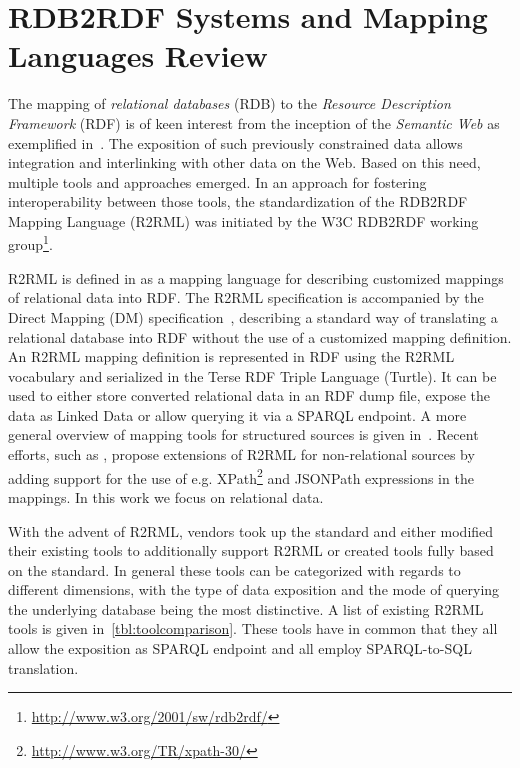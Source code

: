 \section{RDB2RDF Systems and Mapping \\ Languages Review}
\label{sec:mapping-language-review}

The mapping of \emph{relational databases} (RDB) to the \emph{Resource Description Framework} (RDF) is of keen interest from the inception of the \emph{Semantic Web} as exemplified in~\cite{TBL98}.
The exposition of such previously constrained data allows integration and interlinking with other data on the Web.
Based on this need, multiple tools and approaches emerged.
In an approach for fostering interoperability between those tools, the standardization of the RDB2RDF Mapping Language (R2RML) was initiated by the W3C RDB2RDF working group\footnote{\url{http://www.w3.org/2001/sw/rdb2rdf/}}.


R2RML is defined in \cite{r2rml} as a  mapping language for describing customized mappings of relational data into RDF.
The R2RML specification is accompanied by the Direct Mapping (DM) specification~\cite{directmapping}, describing a standard way of translating a relational database into RDF without the use of a customized mapping definition.
An R2RML mapping definition is represented in RDF using the R2RML vocabulary and serialized in the Terse RDF Triple Language (Turtle).
It can be used to either store converted relational data in an RDF dump file, expose the data as Linked Data or allow querying it via a SPARQL endpoint.
A more general overview of mapping tools for structured sources is given in~\cite{UnbehauenSeCo2012}.
Recent efforts, such as \cite{dimou2014rml}, propose extensions of R2RML for non-relational sources by adding support for the use of e.g. XPath\footnote{\url{http://www.w3.org/TR/xpath-30/}} and JSONPath expressions in the mappings.
In this work we focus on relational data.



With the advent of R2RML, vendors took up the standard and either modified their existing tools to additionally support R2RML or created tools fully based on the standard.
In general these tools can be categorized with regards to different dimensions, with the type of data exposition and the mode of querying the underlying database being the most distinctive.
A list of existing R2RML tools is given in~\autoref{tbl:toolcomparison}.
These tools have in common that they all allow the exposition as SPARQL endpoint and all employ SPARQL-to-SQL translation.

